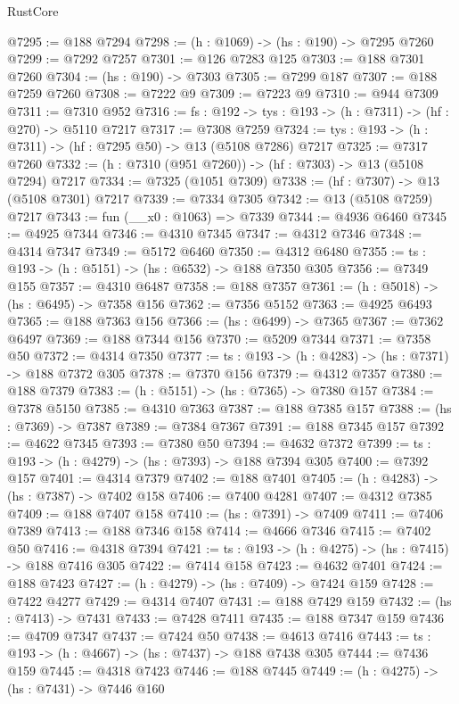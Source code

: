 \begin{lexlean}{RustCore}
\begin{coremodule}
@7295 := @188 @7294
@7298 := (h : @1069) -> (hs : @190) -> @7295 @7260
@7299 := @7292 @7257
@7301 := @126 @7283 @125
@7303 := @188 @7301 @7260
@7304 := (hs : @190) -> @7303
@7305 := @7299 @187
@7307 := @188 @7259 @7260
@7308 := @7222 @9
@7309 := @7223 @9
@7310 := @944 @7309
@7311 := @7310 @952
@7316 := {fs : @192} -> {tys : @193} -> (h : @7311) -> (hf : @270) -> @5110 @7217
@7317 := @7308 @7259
@7324 := {tys : @193} -> (h : @7311) -> (hf : @7295 @50) -> @13 (@5108 @7286) @7217
@7325 := @7317 @7260
@7332 := (h : @7310 (@951 @7260)) -> (hf : @7303) -> @13 (@5108 @7294) @7217
@7334 := @7325 (@1051 @7309)
@7338 := (hf : @7307) -> @13 (@5108 @7301) @7217
@7339 := @7334 @7305
@7342 := @13 (@5108 @7259) @7217
@7343 := fun (__x0 : @1063) => @7339
@7344 := @4936 @6460
@7345 := @4925 @7344
@7346 := @4310 @7345
@7347 := @4312 @7346
@7348 := @4314 @7347
@7349 := @5172 @6460
@7350 := @4312 @6480
@7355 := {ts : @193} -> (h : @5151) -> (hs : @6532) -> @188 @7350 @305
@7356 := @7349 @155
@7357 := @4310 @6487
@7358 := @188 @7357
@7361 := (h : @5018) -> (hs : @6495) -> @7358 @156
@7362 := @7356 @5152
@7363 := @4925 @6493
@7365 := @188 @7363 @156
@7366 := (hs : @6499) -> @7365
@7367 := @7362 @6497
@7369 := @188 @7344 @156
@7370 := @5209 @7344
@7371 := @7358 @50
@7372 := @4314 @7350
@7377 := {ts : @193} -> (h : @4283) -> (hs : @7371) -> @188 @7372 @305
@7378 := @7370 @156
@7379 := @4312 @7357
@7380 := @188 @7379
@7383 := (h : @5151) -> (hs : @7365) -> @7380 @157
@7384 := @7378 @5150
@7385 := @4310 @7363
@7387 := @188 @7385 @157
@7388 := (hs : @7369) -> @7387
@7389 := @7384 @7367
@7391 := @188 @7345 @157
@7392 := @4622 @7345
@7393 := @7380 @50
@7394 := @4632 @7372
@7399 := {ts : @193} -> (h : @4279) -> (hs : @7393) -> @188 @7394 @305
@7400 := @7392 @157
@7401 := @4314 @7379
@7402 := @188 @7401
@7405 := (h : @4283) -> (hs : @7387) -> @7402 @158
@7406 := @7400 @4281
@7407 := @4312 @7385
@7409 := @188 @7407 @158
@7410 := (hs : @7391) -> @7409
@7411 := @7406 @7389
@7413 := @188 @7346 @158
@7414 := @4666 @7346
@7415 := @7402 @50
@7416 := @4318 @7394
@7421 := {ts : @193} -> (h : @4275) -> (hs : @7415) -> @188 @7416 @305
@7422 := @7414 @158
@7423 := @4632 @7401
@7424 := @188 @7423
@7427 := (h : @4279) -> (hs : @7409) -> @7424 @159
@7428 := @7422 @4277
@7429 := @4314 @7407
@7431 := @188 @7429 @159
@7432 := (hs : @7413) -> @7431
@7433 := @7428 @7411
@7435 := @188 @7347 @159
@7436 := @4709 @7347
@7437 := @7424 @50
@7438 := @4613 @7416
@7443 := {ts : @193} -> (h : @4667) -> (hs : @7437) -> @188 @7438 @305
@7444 := @7436 @159
@7445 := @4318 @7423
@7446 := @188 @7445
@7449 := (h : @4275) -> (hs : @7431) -> @7446 @160

\end{coremodule}
\end{lexlean}
